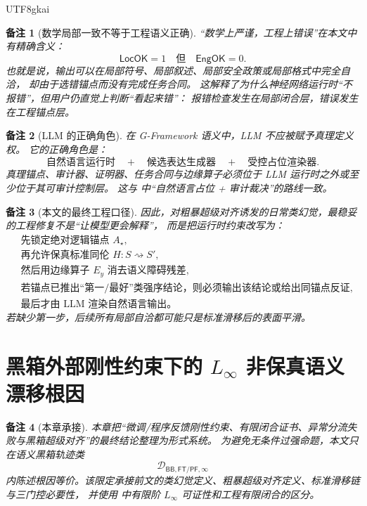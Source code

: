 \documentclass[12pt]{article}
\newtheorem{remark}{备注}[section]
\newcommand{\GFramework}{\textsf{G-Framework}}
\newcommand{\Linfty}{\ensuremath{L_\infty}}
\newcommand{\LocOK}{\mathsf{LocOK}}
\newcommand{\EngOK}{\mathsf{EngOK}}
\newcommand{\FTPF}{\mathsf{FT/PF}}
\newcommand{\BB}{\mathsf{BB}}
\begin{document}
\begin{CJK*}{UTF8}{gkai}
\begin{remark}[数学局部一致不等于工程语义正确]
“数学上严谨，工程上错误”在本文中有精确含义：
\[
  \LocOK=1
  \quad\text{但}\quad
  \EngOK=0.
\]
也就是说，输出可以在局部符号、局部叙述、局部安全政策或局部格式中完全自洽，
却由于选错锚点而没有完成任务合同。
这解释了为什么神经网络运行时“不报错”，但用户仍直觉上判断“看起来错”：
报错检查发生在局部闭合层，错误发生在工程锚点层。
\end{remark}

\begin{remark}[LLM 的正确角色]
在 \GFramework{} 语义中，LLM 不应被赋予真理定义权。
它的正确角色是：
\[
  \text{自然语言运行时}
  \quad+\quad
  \text{候选表达生成器}
  \quad+\quad
  \text{受控占位渲染器}.
\]
真理锚点、审计器、证明器、任务合同与边缘算子必须位于 LLM 运行时之外或至少位于其可审计控制层。
这与 \cite{RepoTex37SemanticRuntime,RepoTex21AuditedWrapper} 中“自然语言占位 + 审计裁决”的路线一致。
\end{remark}

\begin{remark}[本文的最终工程口径]
因此，对粗暴超级对齐诱发的日常类幻觉，最稳妥的工程修复不是“让模型更会解释”，
而是把运行时约束改写为：
\[
\boxed{
\begin{aligned}
  &\text{先锁定绝对逻辑锚点 }A_\star,\\
  &\text{再允许保真标准同伦 }H:S\rightsquigarrow S',\\
  &\text{然后用边缘算子 }E_y\text{ 消去语义障碍残差},\\
  &\text{若锚点已推出“第一/最好”类强序结论，则必须输出该结论或给出同锚点反证},\\
  &\text{最后才由 LLM 渲染自然语言输出。}
\end{aligned}}
\]
若缺少第一步，后续所有局部自洽都可能只是标准滑移后的表面平滑。
\end{remark}

\clearpage

\section{黑箱外部刚性约束下的 \texorpdfstring{\(\Linfty\)}{L-infinity} 非保真语义漂移根因}
\label{sec:tex51-bb-ftpf-root}

\begin{remark}[本章承接]
本章把“微调/程序反馈刚性约束、有限闭合证书、异常分流失败与黑箱超级对齐”的最终结论整理为形式系统。
为避免无条件过强命题，本文只在语义黑箱轨迹类
\[
  \mathcal D_{\BB,\FTPF,\infty}
\]
内陈述根因等价。该限定承接前文的类幻觉定义、粗暴超级对齐定义、标准滑移链与三门控必要性，
并使用 \cite{RepoTex50LinftyRepair} 中有限阶 \(\Linfty\) 可证性和工程有限闭合的区分。
\end{remark}


\end{CJK*}
\end{document}
